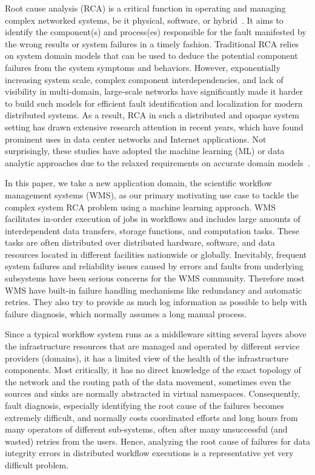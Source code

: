 Root cause analysis (RCA) is a critical function in operating and managing complex networked systems, be it physical, software, or hybrid~\cite{RCA-Review-2017}.
It aims to identify the component(s) and process(es) responsible for the fault manifested by the wrong results or system failures in a timely fashion.
Traditional RCA relies on system domain models that can be used to deduce the potential component failures from the system symptoms and behaviors.
However, exponentially increasing system scale, complex component interdependencies, and lack of visibility in multi-domain, large-scale networks have 
significantly made it harder to build such models for efficient fault identification and localization for modern distributed systems. 
As a result, RCA in such a distributed and opaque system setting has drawn extensive research attention in recent years, which have found prominent uses
 in data center networks and Internet applications. Not surprisingly, these studies have adopted the machine learning (ML) or data analytic approaches
due to the relaxed requirements on accurate domain models~\cite{netbouncer:nsdi18,Link-JIoT-2019}.

In this paper, we take a new application domain, the scientific workflow management systems (WMS), as our primary motivating use case to tackle the complex
 system RCA problem using a machine learning approach. WMS facilitates in-order execution of jobs in workflows and includes large amounts of interdependent
  data transfers, storage functions, and computation tasks. These tasks are often distributed over distributed hardware, software, and data resources
   located in different facilities nationwide or globally. Inevitably, frequent system failures and reliability issues 
caused by errors and faults from underlying subsystems have been serious concerns for the WMS community. 
Therefore most WMS have built-in failure handling mechanisms like redundancy and automatic retries. 
They also try to provide as much log information as possible to help with failure diagnosis, which normally assumes a long manual process.

Since a typical workflow system runs as a middleware sitting several layers above the infrastructure resources that are managed 
and operated by different service providers (domains), it has a limited view of the health of the infrastructure components. 
Most critically, it has no direct knowledge of the exact topology of the network and the routing path of the data movement,
sometimes even the sources and sinks are normally abstracted in virtual namespaces.  
Consequently, fault diagnosis, especially identifying the root cause of the failures becomes extremely difficult, and normally 
costs coordinated efforts and long hours from many operators of different sub-systems, often after many unsuccessful (and wasted) retries from the users. 
Hence, analyzing the root cause of failures for data integrity errors in distributed workflow executions is a representative yet very difficult problem.


